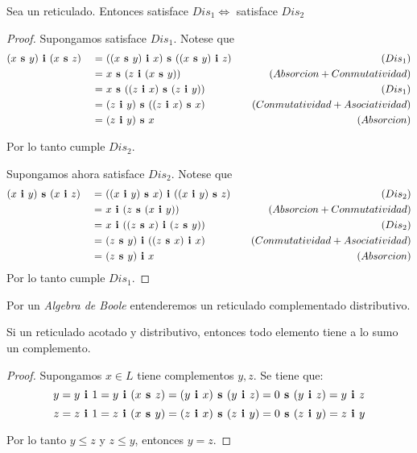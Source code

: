 \begin{lemma}
  Sea \reticulAlg un reticulado. Entonces \reticulAlg satisface $Dis_1 \iff$ \reticulAlg satisface $Dis_2$
\end{lemma}
\begin{proof}
  Supongamos \reticulAlg satisface $Dis_1$. Notese que
  \begin{alignat*}{3}
    &\infbin{(\supbin{x}{y})}{(\supbin{x}{z})} &\ =&\ \supbin{(\infbin{(\supbin{x}{y})}{x})}{(\infbin{(\supbin{x}{y})}{z})} &\quad(Dis_1)\\
    & &\ =&\ \supbin{x}{(\infbin{z}{(\supbin{x}{y})})} &\quad (Absorcion + Conmutatividad)\\
    & &\ =&\ \supbin{x}{(\supbin{(\infbin{z}{x})}{(\infbin{z}{y})})}&\quad (Dis_1)\\
    & &\ =&\ \supbin{(\infbin{z}{y})}{(\supbin{(\infbin{z}{x})}{x})}&\quad (Conmutatividad + Asociatividad)\\
    & &\ =&\ \supbin{(\infbin{z}{y})}{x}&\quad (Absorcion)
  \end{alignat*}
  
  Por lo tanto cumple $Dis_2$.
  
  Supongamos ahora \reticulAlg satisface $Dis_2$. Notese que
  \begin{alignat*}{3}
    &\supbin{(\infbin{x}{y})}{(\infbin{x}{z})} &\ =&\ \infbin{(\supbin{(\infbin{x}{y})}{x})}{(\supbin{(\infbin{x}{y})}{z})} &\quad(Dis_2)\\
    & &\ =&\ \infbin{x}{(\supbin{z}{(\infbin{x}{y})})} &\quad (Absorcion + Conmutatividad)\\
    & &\ =&\ \infbin{x}{(\infbin{(\supbin{z}{x})}{(\supbin{z}{y})})}&\quad (Dis_2)\\
    & &\ =&\ \infbin{(\supbin{z}{y})}{(\infbin{(\supbin{z}{x})}{x})}&\quad (Conmutatividad + Asociatividad)\\
    & &\ =&\ \infbin{(\supbin{z}{y})}{x}&\quad (Absorcion)
  \end{alignat*}
  Por lo tanto cumple $Dis_1$.
\end{proof}

\begin{definition}
  Por un \emph{Algebra de Boole} entenderemos un reticulado complementado distributivo.
\end{definition}

\begin{lemma}
  Si \reticulAcot un reticulado acotado y distributivo, entonces todo elemento tiene a lo sumo un complemento.
\end{lemma}
\begin{proof}
  Supongamos $x \in L$ tiene complementos $y, z$. Se tiene que:
  $$
  y = y\textbf{ i }1 = y\textbf{ i }(x\textbf{ s }z) = (y\textbf{ i }x)\textbf{ s }(y\textbf{ i }z) = 0\textbf{ s }(y\textbf{ i }z) = y\textbf{ i }z
  $$
  $$
  z = z\textbf{ i }1 = z\textbf{ i }(x\textbf{ s }y) = (z\textbf{ i }x)\textbf{ s }(z\textbf{ i }y) = 0\textbf{ s }(z\textbf{ i }y) = z\textbf{ i }y 
  $$

  Por lo tanto $y \leq z$ y $z \leq y$, entonces $y = z$.
\end{proof}

